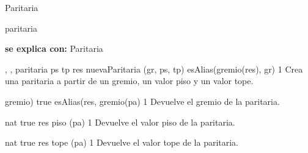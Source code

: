 \begin{interfaz}{Paritaria}

\begin{iparamformales}{paritaria}

\textbf{\large se explica con:} Paritaria

\end{iparamformales}

{, , }{paritaria}
{ps \menorigual tp}
{res \igobs nuevaParitaria (gr, ps, tp)  \ly esAlias(gremio(res), gr) }
{1}
{Crea una paritaria a partir de un gremio, un valor piso y un valor tope.}
{}

{}{gremio)}
{true}
{esAlias(res, gremio(pa)  }
{1}
{Devuelve el gremio de la paritaria.}
{}

{}{nat}
{true}
{res \igobs piso (pa)}
{1}
{Devuelve el valor piso de la paritaria.}
{}

{}{nat}
{true}
{res \igobs tope (pa)}
{1}
{Devuelve el valor tope de la paritaria.}
{}

\end{interfaz}